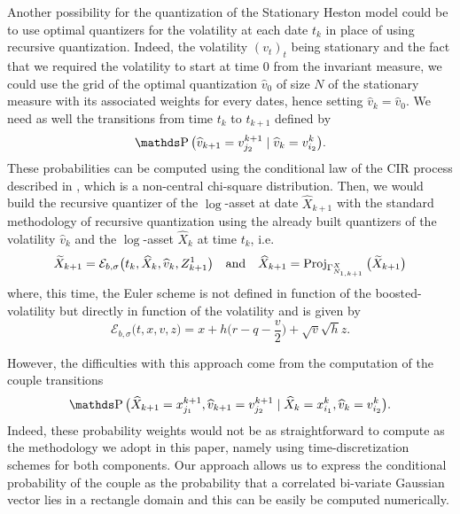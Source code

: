 \begin{remark}
	Another possibility for the quantization of the Stationary Heston model could be to use optimal quantizers for the volatility at each date $t_k$ in place of using recursive quantization. Indeed, the volatility $(v_t)_t$ being stationary and the fact that we required the volatility to start at time $0$ from the invariant measure, we could use the grid of the optimal quantization $\widehat v_0$ of size $N$ of the stationary measure with its associated weights for every dates, hence setting $\widehat v_k = \widehat v_0$. We need as well the transitions from time $t_k$ to $t_{k+1}$ defined by
	\begin{equation}
		\Prob \big( \widehat v_{k+1} = v_{j_2}^{k+1} \mid \widehat v_k = v_{i_2}^k \big).
	\end{equation}
	These probabilities can be computed using the conditional law of the CIR process described in \cite{cox2005theory, andersen2007efficient}, which is a non-central chi-square distribution.
	Then, we would build the recursive quantizer of the $\log$-asset at date $\widehat X_{k+1}$ with the standard methodology of recursive quantization using the already built quantizers of the volatility $\widehat v_k$ and the $\log$-asset $\widehat X_k$ at time $t_k$, i.e.
	\begin{equation}
		\widetilde X_{k+1} = \mathcal{E}_{b, \sigma} \big( t_k, \widehat X_k, \widehat v_k, Z_{k+1}^1 \big) \quad \mbox{and} \quad \widehat X_{k+1} = \operatorname{\mathrm{Proj}}_{\Gamma_{N_{1,k+1}}^X} \big( \widetilde{X}_{k+1} \big)
	\end{equation}
	where, this time, the Euler scheme is not defined in function of the boosted-volatility but directly in function of the volatility and is given by
	\begin{equation}
		\mathcal{E}_{b, \sigma} \big( t, x, v, z \big) = x + h \Big( r - q - \frac{v}{2} \Big) + \sqrt{v} \sqrt{h} z.
	\end{equation}

	\medskip
	However, the difficulties with this approach come from the computation of the couple transitions
	\begin{equation}
		\Prob \big( \widehat X_{k+1} = x_{j_1}^{k+1}, \widehat v_{k+1} = v_{j_2}^{k+1} \mid \widehat X_k = x_{i_1}^k, \widehat v_k = v_{i_2}^k \big).
	\end{equation}
	Indeed, these probability weights would not be as straightforward to compute as the methodology we adopt in this paper, namely using time-discretization schemes for both components. Our approach allows us to express the conditional probability of the couple as the probability that a correlated bi-variate Gaussian vector lies in a rectangle domain and this can be easily be computed numerically.




\end{remark}
